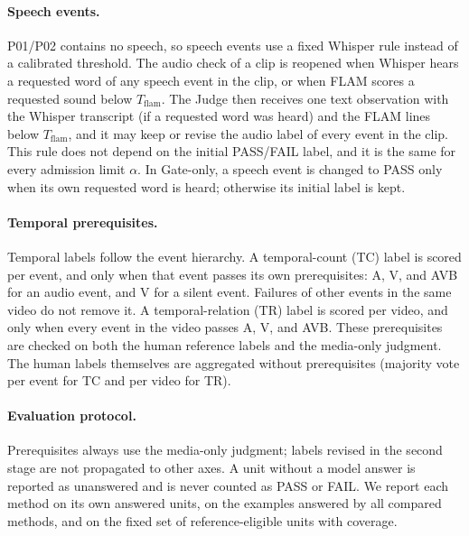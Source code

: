 
\paragraph{Speech events.}
P01/P02 contains no speech, so speech events use a fixed Whisper rule instead of a calibrated threshold.
The audio check of a clip is reopened when Whisper hears a requested word of any speech event in the clip, or when FLAM scores a requested sound below $T_{\text{flam}}$.
The Judge then receives one text observation with the Whisper transcript (if a requested word was heard) and the FLAM lines below $T_{\text{flam}}$, and it may keep or revise the audio label of every event in the clip.
This rule does not depend on the initial PASS/FAIL label, and it is the same for every admission limit $\alpha$.
In Gate-only, a speech event is changed to PASS only when its own requested word is heard; otherwise its initial label is kept.

\paragraph{Temporal prerequisites.}
Temporal labels follow the event hierarchy.
A temporal-count (TC) label is scored per event, and only when that event passes its own prerequisites: A, V, and AVB for an audio event, and V for a silent event.
Failures of other events in the same video do not remove it.
A temporal-relation (TR) label is scored per video, and only when every event in the video passes A, V, and AVB.
These prerequisites are checked on both the human reference labels and the media-only judgment.
The human labels themselves are aggregated without prerequisites (majority vote per event for TC and per video for TR).

\paragraph{Evaluation protocol.}
Prerequisites always use the media-only judgment; labels revised in the second stage are not propagated to other axes.
A unit without a model answer is reported as unanswered and is never counted as PASS or FAIL.
We report each method on its own answered units, on the examples answered by all compared methods, and on the fixed set of reference-eligible units with coverage.

